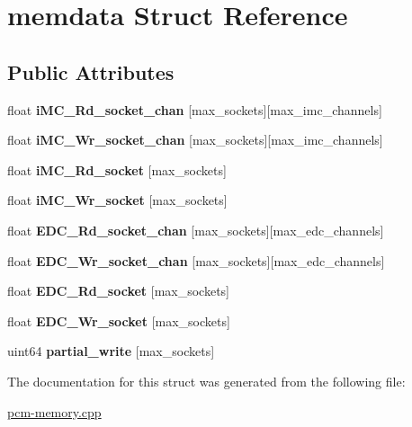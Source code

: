 \hypertarget{structmemdata}{}\section{memdata Struct Reference}
\label{structmemdata}
\subsection*{Public Attributes}
\begin{DoxyCompactItemize}
\item 
\mbox{\label{structmemdata_ab6c2b2f802d5f0d69ddd546dcf21e142}} 
float {\bfseries i\+M\+C\+\_\+\+Rd\+\_\+socket\+\_\+chan} \mbox{[}max\+\_\+sockets\mbox{]}\mbox{[}max\+\_\+imc\+\_\+channels\mbox{]}
\item 
\mbox{\label{structmemdata_aeac15c4ce5b43f024cecca4c58f3b176}} 
float {\bfseries i\+M\+C\+\_\+\+Wr\+\_\+socket\+\_\+chan} \mbox{[}max\+\_\+sockets\mbox{]}\mbox{[}max\+\_\+imc\+\_\+channels\mbox{]}
\item 
\mbox{\label{structmemdata_aaf918650a303e6a99dc353263ade35a4}} 
float {\bfseries i\+M\+C\+\_\+\+Rd\+\_\+socket} \mbox{[}max\+\_\+sockets\mbox{]}
\item 
\mbox{\label{structmemdata_a689eb20051fcd7d835ee5e685db6390f}} 
float {\bfseries i\+M\+C\+\_\+\+Wr\+\_\+socket} \mbox{[}max\+\_\+sockets\mbox{]}
\item 
\mbox{\label{structmemdata_a6b56866bb465b62662bf4fa7c1aced10}} 
float {\bfseries E\+D\+C\+\_\+\+Rd\+\_\+socket\+\_\+chan} \mbox{[}max\+\_\+sockets\mbox{]}\mbox{[}max\+\_\+edc\+\_\+channels\mbox{]}
\item 
\mbox{\label{structmemdata_a4ca2b57f962b2d0d3649868a1a4199ba}} 
float {\bfseries E\+D\+C\+\_\+\+Wr\+\_\+socket\+\_\+chan} \mbox{[}max\+\_\+sockets\mbox{]}\mbox{[}max\+\_\+edc\+\_\+channels\mbox{]}
\item 
\mbox{\label{structmemdata_a43eee155761fbebb23ce86a7ab954fff}} 
float {\bfseries E\+D\+C\+\_\+\+Rd\+\_\+socket} \mbox{[}max\+\_\+sockets\mbox{]}
\item 
\mbox{\label{structmemdata_afe5a628e9ad97b72fd12e7b6de78e784}} 
float {\bfseries E\+D\+C\+\_\+\+Wr\+\_\+socket} \mbox{[}max\+\_\+sockets\mbox{]}
\item 
\mbox{\label{structmemdata_a28e131c751efa29fd9b0670dcbb8e073}} 
uint64 {\bfseries partial\+\_\+write} \mbox{[}max\+\_\+sockets\mbox{]}
\end{DoxyCompactItemize}


The documentation for this struct was generated from the following file\+:\begin{DoxyCompactItemize}
\item 
\mbox{\hyperlink{pcm-memory_8cpp}{pcm-\/memory.\+cpp}}\end{DoxyCompactItemize}
